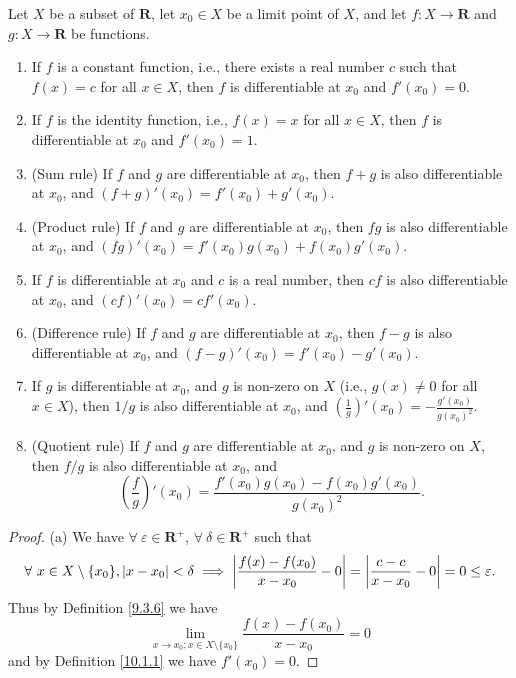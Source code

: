 \begin{theorem}\label{10.1.13}
    Let \(X\) be a subset of \(\mathbf{R}\), let \(x_0 \in X\) be a limit point of \(X\), and let \(f : X \to \mathbf{R}\) and \(g : X \to \mathbf{R}\) be functions.
    \begin{enumerate}
        \item If \(f\) is a constant function, i.e., there exists a real number \(c\) such that \(f(x) = c\) for all \(x \in X\), then \(f\) is differentiable at \(x_0\) and \(f'(x_0) = 0\).
        \item If \(f\) is the identity function, i.e., \(f(x) = x\) for all \(x \in X\), then \(f\) is differentiable at \(x_0\) and \(f'(x_0) = 1\).
        \item (Sum rule)
              If \(f\) and \(g\) are differentiable at \(x_0\), then \(f + g\) is also differentiable at \(x_0\), and \((f + g)'(x_0) = f'(x_0) + g'(x_0)\).
        \item (Product rule)
              If \(f\) and \(g\) are differentiable at \(x_0\), then \(fg\) is also differentiable at \(x_0\), and \((fg)'(x_0) = f'(x_0)g(x_0) + f(x_0)g'(x_0)\).
        \item If \(f\) is differentiable at \(x_0\) and \(c\) is a real number, then \(cf\) is also differentiable at \(x_0\), and \((cf)'(x_0) = cf'(x_0)\).
        \item (Difference rule)
              If \(f\) and \(g\) are differentiable at \(x_0\), then \(f - g\) is also differentiable at \(x_0\), and \((f - g)'(x_0) = f'(x_0) - g'(x_0)\).
        \item If \(g\) is differentiable at \(x_0\), and \(g\) is non-zero on \(X\) (i.e., \(g(x) \neq 0\) for all \(x \in X\)), then \(1 / g\) is also differentiable at \(x_0\), and \((\frac{1}{g})'(x_0) = -\frac{g'(x_0)}{g(x_0)^2}\).
        \item (Quotient rule)
              If \(f\) and \(g\) are differentiable at \(x_0\), and \(g\) is non-zero on \(X\), then \(f / g\) is also differentiable at \(x_0\), and
              \[
                  (\frac{f}{g})'(x_0) = \frac{f'(x_0) g(x_0) - f(x_0) g'(x_0)}{g(x_0)^2}.
              \]
    \end{enumerate}
\end{theorem}

\begin{proof}{(a)}
    We have \(\forall\ \varepsilon \in \mathbf{R}^+\), \(\forall\ \delta \in \mathbf{R}^+\) such that
    \[
        \forall\ x \in X \setminus \{x_0\}, \abs*{x - x_0} < \delta \implies \abs*{\frac{f(x) - f(x_0)}{x - x_0} - 0} = \abs*{\frac{c - c}{x - x_0} - 0} = 0 \leq \varepsilon.
    \]
    Thus by Definition \ref{9.3.6} we have
    \[
        \lim_{x \to x_0 ; x \in X \setminus \{x_0\}} \frac{f(x) - f(x_0)}{x - x_0} = 0
    \]
    and by Definition \ref{10.1.1} we have \(f'(x_0) = 0\).
\end{proof}

